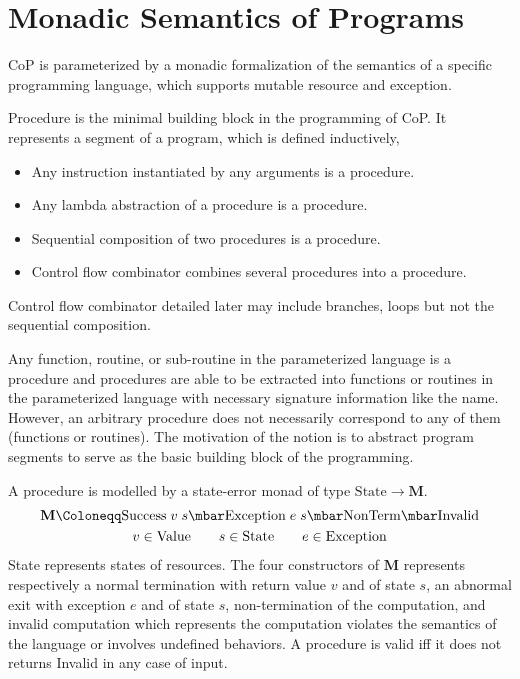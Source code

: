 \section{Monadic Semantics of Programs}\label{sec:prog-sem}

CoP is parameterized by a monadic formalization of the semantics of a specific programming language, which supports mutable resource and exception.

Procedure is the minimal building block in the programming of CoP.
It represents a segment of a program, which is defined inductively,
\begin{itemize}
\item Any instruction instantiated by any arguments is a procedure.
\item Any lambda abstraction of a procedure is a procedure.
\item Sequential composition of two procedures is a procedure.
\item Control flow combinator combines several procedures into a procedure.
\end{itemize}
Control flow combinator detailed later may include branches, loops but not the sequential composition.

Any function, routine, or sub-routine in the parameterized language is a procedure
and procedures are able to be extracted into functions or routines in the parameterized language with necessary signature information like the name.
However, an arbitrary procedure does not necessarily correspond to any of them (functions or routines).
The motivation of the notion is to abstract program segments to serve as the basic building block of the programming.

A procedure is modelled by a state-error monad of type $\mathrm{State} \rightarrow \mathbf{M}$.
\begin{gather*}
\mathbf{M} \Coloneqq \mathrm{Success}\;v\;s \mbar \mathrm{Exception}\;e\;s \mbar \mathrm{NonTerm} \mbar \mathrm{Invalid}\\
v \in \mathrm{Value} \qquad s \in \text{State} \qquad e \in \mathrm{Exception}
\end{gather*}
State represents states of resources.
The four constructors of $\mathbf{M}$ represents respectively a normal termination with return value $v$ and of state $s$, an abnormal exit with exception $e$ and of state $s$, non-termination of the computation, and invalid computation which represents the computation violates the semantics of the language or involves undefined behaviors.
A procedure is valid iff it does not returns Invalid in any case of input.

